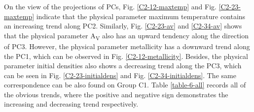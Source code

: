 \documentclass{aa}
\begin{document}
\begin{CJK*}{UTF8}{gbsn}
   On the view of the projections of PCs, Fig. \ref{C2-12-maxtemp} and Fig. \ref{C2-23-maxtemp} indicate that the physical parameter maximum temperature contains an increasing trend along PC2. 
   Similarly, Fig. \ref{C2-23-av} and \ref{C2-34-av} shows that the physical parameter A\textsubscript{V} also has an upward tendency along the direction of PC3. 
   However, the physical parameter metallicity has a downward trend along the PC1, which can be observed in Fig. \ref{C2-12-metallicity}. Besides, the physical parameter initial densities also shows a decreasing trend along the PC3, which can be seen in Fig. \ref{C2-23-initialdens} and Fig. \ref{C2-34-initialdens}. 
   The same correspondence can be also found on Group C1. 
   Table \ref{table-6-all} records all of the obvious trends, where the positive and negative sign demonstrates the increasing and decreasing trend respectively. 
   

\end{CJK*}
\end{document}
